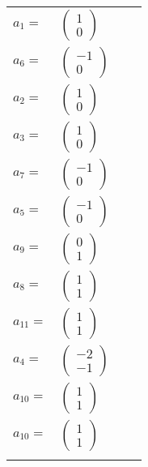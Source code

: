 \documentclass[1p]{elsarticle_modified}
\theoremstyle{definition}
\begin{document}
\begin{tabular}{m{7pt} m{180pt} m{7pt} m{180pt} }
\flushright $a_{1}=$&$\begin{pmatrix}1\\0\end{pmatrix}$ \\
\flushright $a_{6}=$&$\begin{pmatrix}-1\\0\end{pmatrix}$ \\
\flushright $a_{2}=$&$\begin{pmatrix}1\\0\end{pmatrix}$ \\
\flushright $a_{3}=$&$\begin{pmatrix}1\\0\end{pmatrix}$ \\
\flushright $a_{7}=$&$\begin{pmatrix}-1\\0\end{pmatrix}$ \\
\flushright $a_{5}=$&$\begin{pmatrix}-1\\0\end{pmatrix}$ \\
\flushright $a_{9}=$&$\begin{pmatrix}0\\1\end{pmatrix}$ \\
\flushright $a_{8}=$&$\begin{pmatrix}1\\1\end{pmatrix}$ \\
\flushright $a_{11}=$&$\begin{pmatrix}1\\1\end{pmatrix}$ \\
\flushright $a_{4}=$&$\begin{pmatrix}-2\\-1\end{pmatrix}$ \\
\flushright $a_{10}=$&$\begin{pmatrix}1\\1\end{pmatrix}$\\ \flushright $a_{10}=$&$\begin{pmatrix}1\\1\end{pmatrix}$\\&\end{tabular}
\end{document}
